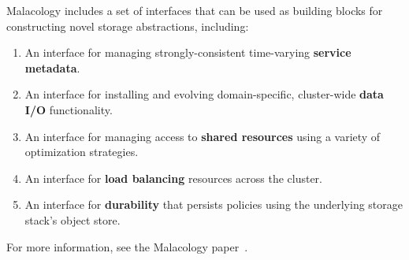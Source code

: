 Malacology includes a set of interfaces that can be used as
building blocks for constructing novel storage abstractions, including:

\begin{enumerate}

\item An interface for managing strongly-consistent time-varying
\textbf{service metadata}.

\item An interface for installing and evolving domain-specific, cluster-wide
\textbf{data I/O} functionality.

\item An interface for managing access to \textbf{shared resources} using a
variety of optimization strategies.

\item An interface for \textbf{load balancing} resources across the cluster.

\item An interface for \textbf{durability} that persists policies using the
underlying storage stack's object store.

\end{enumerate}

For more information, see the Malacology paper~\cite{sevilla:eurosys17-malacology}.
